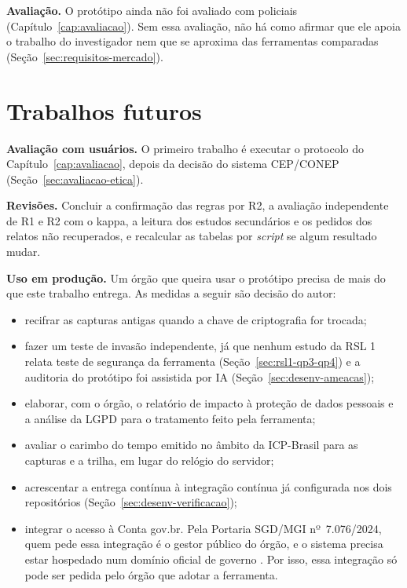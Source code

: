 \textbf{Avaliação.} O protótipo ainda não foi avaliado com policiais
(Capítulo~\ref{cap:avaliacao}). Sem essa avaliação, não há como afirmar que
ele apoia o trabalho do investigador nem que se aproxima das ferramentas
comparadas (Seção~\ref{sec:requisitos-mercado}).

\section{Trabalhos futuros}
\label{sec:consideracoes-futuros}

\textbf{Avaliação com usuários.} O primeiro trabalho é executar o protocolo
do Capítulo~\ref{cap:avaliacao}, depois da decisão do sistema CEP/CONEP
(Seção~\ref{sec:avaliacao-etica}).

\textbf{Revisões.} Concluir a confirmação das regras por R2, a avaliação
independente de R1 e R2 com o kappa, a leitura dos estudos secundários e os
pedidos dos relatos não recuperados, e recalcular as tabelas por
\textit{script} se algum resultado mudar.

\textbf{Uso em produção.} Um órgão que queira usar o protótipo precisa de
mais do que este trabalho entrega. As medidas a seguir são decisão do autor:
\begin{itemize}
	\item recifrar as capturas antigas quando a chave de criptografia for
	trocada;
	\item fazer um teste de invasão independente, já que nenhum estudo da
	RSL 1 relata teste de segurança da ferramenta
	(Seção~\ref{sec:rsl1-qp3-qp4}) e a auditoria do protótipo foi assistida
	por IA (Seção~\ref{sec:desenv-ameacas});
	\item elaborar, com o órgão, o relatório de impacto à proteção de dados
	pessoais e a análise da LGPD para o tratamento feito pela ferramenta;
	\item avaliar o carimbo do tempo emitido no âmbito da ICP-Brasil para as
	capturas e a trilha, em lugar do relógio do servidor;
	\item acrescentar a entrega contínua à integração contínua já
	configurada nos dois repositórios (Seção~\ref{sec:desenv-verificacao});
	\item integrar o acesso à Conta gov.br. Pela Portaria SGD/MGI
	nº~7.076/2024, quem pede essa integração é o gestor público do órgão, e
	o sistema precisa estar hospedado num domínio oficial de governo
	\cite[art.~3º e art.~4º, § 1º]{brasil2024portariasgd7076}. Por isso, essa integração só
	pode ser pedida pelo órgão que adotar a ferramenta.
\end{itemize}

